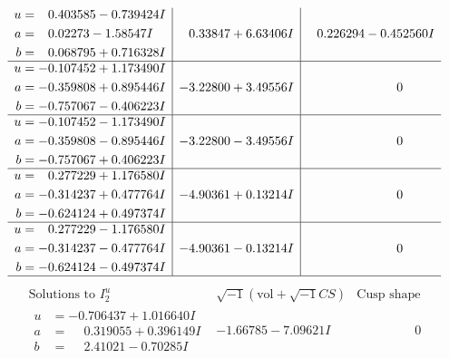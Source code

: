 \documentclass[1p]{elsarticle_modified}
\theoremstyle{definition}
\newcommand{\I}{\sqrt{-1}}
\begin{document}
$$\begin{array}{c|c|c}
\begin{aligned}
u &= \phantom{-}0.403585 - 0.739424 I \\
a &= \phantom{-}0.02273 - 1.58547 I \\
b &= \phantom{-}0.068795 + 0.716328 I\end{aligned}
 & \phantom{-}0.33847 + 6.63406 I & \phantom{-}0.226294 - 0.452560 I \\ \hline\begin{aligned}
u &= -0.107452 + 1.173490 I \\
a &= -0.359808 + 0.895446 I \\
b &= -0.757067 - 0.406223 I\end{aligned}
 & -3.22800 + 3.49556 I & \phantom{-0.000000 } 0 \\ \hline\begin{aligned}
u &= -0.107452 - 1.173490 I \\
a &= -0.359808 - 0.895446 I \\
b &= -0.757067 + 0.406223 I\end{aligned}
 & -3.22800 - 3.49556 I & \phantom{-0.000000 } 0 \\ \hline\begin{aligned}
u &= \phantom{-}0.277229 + 1.176580 I \\
a &= -0.314237 + 0.477764 I \\
b &= -0.624124 + 0.497374 I\end{aligned}
 & -4.90361 + 0.13214 I & \phantom{-0.000000 } 0 \\ \hline\begin{aligned}
u &= \phantom{-}0.277229 - 1.176580 I \\
a &= -0.314237 - 0.477764 I \\
b &= -0.624124 - 0.497374 I\end{aligned}
 & -4.90361 - 0.13214 I & \phantom{-0.000000 } 0\\
 \hline 
 \end{array}$$\newpage$$\begin{array}{c|c|c}  
\text{Solutions to }I^u_{2}& \I (\text{vol} + \sqrt{-1}CS) & \text{Cusp shape}\\
 \hline 
\begin{aligned}
u &= -0.706437 + 1.016640 I \\
a &= \phantom{-}0.319055 + 0.396149 I \\
b &= \phantom{-}2.41021 - 0.70285 I\end{aligned}
 & -1.66785 - 7.09621 I & \phantom{-0.000000 } 0 \\ \hline\begin{aligned}

\end{aligned}
\end{array}$$
\end{document}
